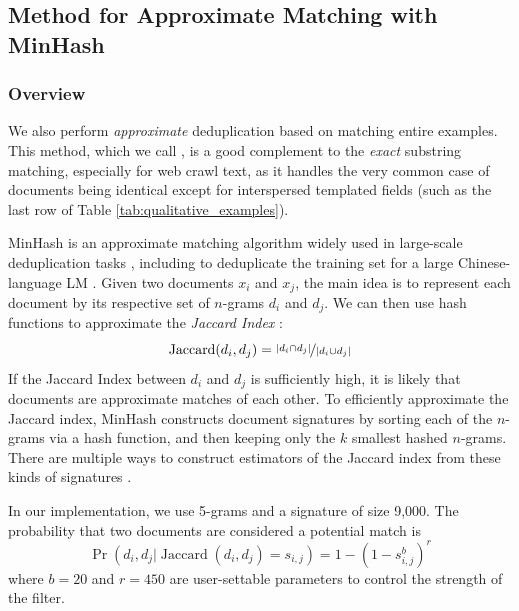 \subsection{Method for Approximate Matching with MinHash} \label{sec:approx}

\subsubsection{Overview}

We also perform \emph{approximate} deduplication based on matching entire examples.
This method, which we call \Approx, is a good complement to the \emph{exact} substring matching, especially for web crawl text, as it handles the very common case of documents being identical except for interspersed templated fields (such as the last row of Table \ref{tab:qualitative_examples}).

MinHash \citep{broder1997resemblance} is an approximate matching algorithm widely used in large-scale deduplication tasks \citep{versley2012not,GABRIEL201863,gyawali2020deduplication}, including to deduplicate the training set for a large Chinese-language LM \citep{zeng2021pangualpha}.
Given two documents $x_i$ and $x_j$, the main idea is to represent each document by its respective set of $n$-grams $d_i$ and $d_j$.
We can then use hash functions to approximate the \emph{Jaccard Index} \citep{jaccard1912distribution}:
\begin{equation}
\operatorname{Jaccard}(d_i, d_j) = \nicefrac{|d_i \cap d_j|}{|d_i \cup d_j|}
\end{equation}
If the Jaccard Index between $d_i$ and $d_j$ is sufficiently high, it is likely that documents are approximate matches of each other.
To efficiently approximate the Jaccard index, MinHash constructs document signatures by sorting each of the $n$-grams via a hash function, and then keeping only the $k$ smallest hashed $n$-grams.
There are multiple ways to construct estimators of the Jaccard index from these kinds of signatures \citep{cohen2016min}.

In our implementation, we use 5-grams and a signature of size 9,000. The probability that two documents are considered a potential match is
\begin{equation}
\operatorname{Pr}(d_i, d_j | \operatorname{Jaccard}(d_i, d_j) = s_{i, j}) = 1 - (1 - s_{i, j}^b)^r
\end{equation}
where $b=20$ and $r=450$ are user-settable parameters to control the strength of the filter.

